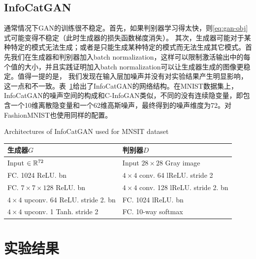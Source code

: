 \subsection{InfoCatGAN}
通常情况下GAN的训练很不稳定。首先，如果判别器学习得太快，则\eqref{eq:gan-obj}式可能变得不稳定（此时生成器的损失函数梯度消失）。
其次，生成器可能对于某种特定的模式无法生成；或者是只能生成某种特定的模式而无法生成其它模式。首先我们在生成器和判别器加入batch normalization，这样可以限制激活输出中的每个值的大小，并且实践证明加入batch normalization可以让生成器生成的图像更稳定。值得一提的是，
我们发现在输入层加噪声并没有对实验结果产生明显影响，这一点和\citet{springenberg2015unsupervised}不一致。表~\ref{tab:m-icg-netarch}给出了InfoCatGAN的网络结构。在MNIST数据集上，InfoCatGAN的噪声空间的构成和C-InfoGAN类似，不同的没有连续隐变量，即包含一个10维离散隐变量和一个62维高斯噪声，最终得到的噪声维度为72。对FashionMNIST也使用同样的配置。
\begin{table}[h]
  \centering
  {Architectures of InfoCatGAN used for MNSIT dataset}
  \begin{tabular}{l|l}
    \toprule
    \textbf{生成器$G$}                        & \textbf{判别器$D$} \\
    \midrule
    Input $\in \mathbb{R}^{72}$                   & Input $28\times 28$ Gray image \\ \hline
    FC. 1024 ReLU. bn                         & $4\times 4$ conv. 64 lReLU. stride 2  \\ \hline
    FC. $7\times7\times128$ ReLU. bn          & $4\times 4$ conv. 128 lReLU. stride 2. bn \\ \hline
    $4\times 4$ upconv. 64 ReLU. stride 2. bn & FC. 1024 lReLU. bn \\ \hline
    $4\times 4$ upconv. 1 Tanh. stride 2     & FC. 10-way softmax \\
    \bottomrule
  \end{tabular}
  \label{tab:m-icg-netarch}
\end{table}

\section{实验结果}\label{sec:results}

